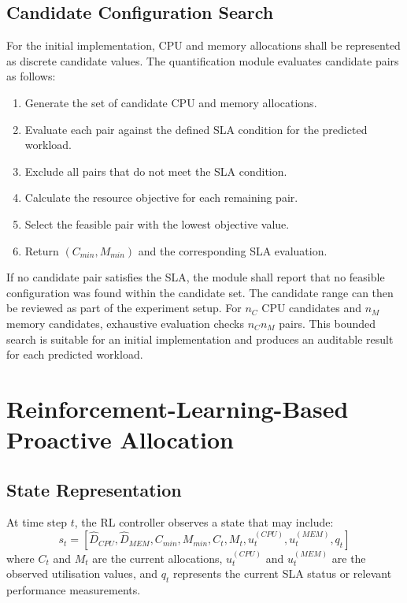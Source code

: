 \documentclass[12pt,a4paper]{report}
\begin{document}
\subsection{Candidate Configuration Search}
For the initial implementation, CPU and memory allocations shall be represented as discrete candidate values. The quantification module evaluates candidate pairs as follows:
\begin{enumerate}
    \item Generate the set of candidate CPU and memory allocations.
    \item Evaluate each pair against the defined SLA condition for the predicted workload.
    \item Exclude all pairs that do not meet the SLA condition.
    \item Calculate the resource objective for each remaining pair.
    \item Select the feasible pair with the lowest objective value.
    \item Return $(C_{min}, M_{min})$ and the corresponding SLA evaluation.
\end{enumerate}
If no candidate pair satisfies the SLA, the module shall report that no feasible configuration was found within the candidate set. The candidate range can then be reviewed as part of the experiment setup.
For $n_{C}$ CPU candidates and $n_{M}$ memory candidates, exhaustive evaluation checks $n_{C} n_{M}$ pairs. This bounded search is suitable for an initial implementation and produces an auditable result for each predicted workload.

\section{Reinforcement-Learning-Based Proactive Allocation}
\subsection{State Representation}
At time step $t$, the RL controller observes a state that may include:
\begin{equation}
s_{t} = [\hat{D}_{CPU}, \hat{D}_{MEM}, C_{min}, M_{min}, C_{t}, M_{t}, u_{t}^{(CPU)}, u_{t}^{(MEM)}, q_{t}]
\end{equation}
where $C_{t}$ and $M_{t}$ are the current allocations, $u_{t}^{(CPU)}$ and $u_{t}^{(MEM)}$ are the observed utilisation values, and $q_{t}$ represents the current SLA status or relevant performance measurements.
\end{document}
